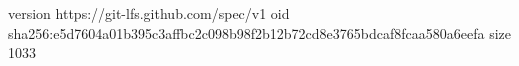 version https://git-lfs.github.com/spec/v1
oid sha256:e5d7604a01b395c3affbc2c098b98f2b12b72cd8e3765bdcaf8fcaa580a6eefa
size 1033
